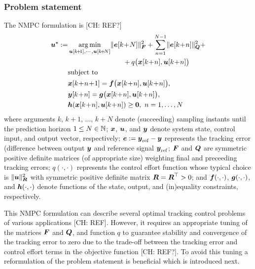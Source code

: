 \documentclass[journal]{IEEEtranTIE}
\newcommand{\CHHA}[1]{{\color{red} [CH: #1]}} %
\begin{document}
\subsubsection{Problem statement}

The NMPC formulation is \CHHA{REF?}
\begin{subequations}\label{eq:NMPC1}
\begin{align}
\mv{u}^\star:=&\mathop {\rm arg\min }\limits_{\mv{u}[k\!+\!1], \cdots ,\mv{u}[k\!+\!N]} \norm{\mv{e}[k\!+\!N]}_{\mm{F}}^2 + \sum\limits_{n = 1}^{N - 1} \norm{\mv{e}[k\!+\!n]}_{\mm{Q}}^2 + \nonumber \\ 
& \qquad \qquad \qquad \qquad + q\big( \mv{x}[k\!+\!n],\mv{u}[k\!+\!n] \big) \label{eq:NMPC1 - objective function} \\
&{\rm{subject\ to}} \nonumber\\
&\mv{x}[k\!+\!n\!+\!1] = \mv{f}\big( \mv{x}[k\!+\!n] ,\mv{u}[k\!+\!n] \big), \\ &\mv{y}[k\!+\!n]  = \mv{g}\big(\mv{x}[k\!+\!n], \mv{u}[k\!+\!n] \big), \\
&\mv{h}(\mv{x}[k\!+\!n],\mv{u}[k\!+\!n]) \ge \mv{0},\ n = 1, \ldots ,N %
\end{align}
\end{subequations}
where arguments $k$, $k\!+\!1$, $\dots$, $k\!+\!N$ denote (succeeding) sampling instants until the prediction horizon  $1 \leq N \in \mathbb{N}$; $\boldsymbol{x}$, $\boldsymbol{u}$, and $\boldsymbol{y}$ denote system state, control input, and output vector, respectively; $\boldsymbol{e} := \boldsymbol{y}_{\mathrm{ref}} - \boldsymbol{y}$ represents the tracking error (difference between output $\boldsymbol{y}$ and reference signal $\boldsymbol{y}_{\mathrm{ref}}$; $\boldsymbol{F}$ and $\boldsymbol{Q}$ are symmetric positive definite matrices (of appropriate size) weighting final and preceeding tracking errors; $q(\cdot, \cdot)$ represents the control effort function whose typical choice is $\lVert  \boldsymbol{u}  \rVert_{\boldsymbol{R}}^2$ with symmetric positive definite matrix $\boldsymbol{R}=\boldsymbol{R}^\top >0$; and $\boldsymbol{f}(\cdot,\cdot)$, $\boldsymbol{g}(\cdot,\cdot)$, and $\boldsymbol{h}(\cdot,\cdot)$ denote functions of the state, output, and (in)equality constraints, respectively. 

This NMPC formulation can describe several optimal tracking control problems of various applications \CHHA{REF}. However, it requires an appropriate tuning of the matrices $\boldsymbol{F}$ and $\boldsymbol{Q}$, and function $q$ to guarantee stability and convergence of the tracking error to zero due to the trade-off between the tracking error and control effort terms in the objective function \CHHA{REF?}.
To avoid this tuning a reformulation of the problem statement is beneficial which is introduced next. 
\end{document}
